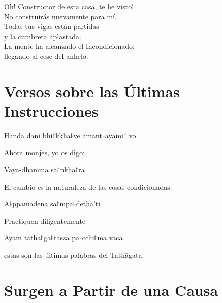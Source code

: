 \begin{english}
  Oh! Constructor de esta casa, te he visto!\\
  No construirás nuevamente para mí.\\
  Todas tus vigas están partidas\\
  y la cumbrera aplastada.\\
  La mente ha alcanzado el Incondicionado;\\
  llegando al cese del anhelo.
\end{english}

\chapter[Las Últimas Instrucciones]{Versos sobre las Últimas Instrucciones}


\begin{leader}
\end{leader}

Handa dāni bhi꜓kkha꜕ve āmant꜕ayāmi꜓ vo

\begin{english}
  Ahora monjes, yo os digo:
\end{english}

Vaya-dhammā sa꜓ṅkhā꜓rā

\begin{english}
  El cambio es la naturaleza de las cosas condicionadas.
\end{english}

A꜕ppamādena sa꜓mpā꜕dethā'ti

\begin{english}
  Practiquen diligentemente --
\end{english}

Ayaṁ tathā꜓ga꜕tassa pa꜕cchi꜓mā vācā

\begin{english}
  estas son las últimas palabras del Tathāgata.
\end{english}

\chapter{Surgen a Partir de una Causa}


\begin{leader}
\end{leader}


